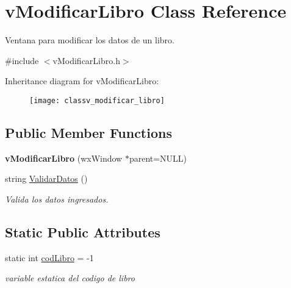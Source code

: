 \hypertarget{classv_modificar_libro}{}\section{v\+Modificar\+Libro Class Reference}
\label{classv_modificar_libro}


Ventana para modificar los datos de un libro.  




{\ttfamily \#include $<$v\+Modificar\+Libro.\+h$>$}

Inheritance diagram for v\+Modificar\+Libro\+:\begin{figure}[H]
\begin{center}
\leavevmode
\texttt{[image: classv\_modificar\_libro]}
\end{center}
\end{figure}
\subsection*{Public Member Functions}
\begin{DoxyCompactItemize}
\item 
{\bfseries v\+Modificar\+Libro} (wx\+Window $\ast$parent=N\+U\+LL)\hypertarget{classv_modificar_libro_ab9f38d4cbc620858c99c91dad0af5493}{}\label{classv_modificar_libro_ab9f38d4cbc620858c99c91dad0af5493}

\item 
string \hyperlink{classv_modificar_libro_a175daf636185fd7814692fed543fda21}{Validar\+Datos} ()\hypertarget{classv_modificar_libro_a175daf636185fd7814692fed543fda21}{}\label{classv_modificar_libro_a175daf636185fd7814692fed543fda21}

\begin{DoxyCompactList}\small\item\em Valida los datos ingresados. \end{DoxyCompactList}\end{DoxyCompactItemize}
\subsection*{Static Public Attributes}
\begin{DoxyCompactItemize}
\item 
static int \hyperlink{classv_modificar_libro_a88a10764b43adc0d365871ad2da42d28}{cod\+Libro} = -\/1
\begin{DoxyCompactList}\small\item\em variable estatica del codigo de libro \end{DoxyCompactList}\end{DoxyCompactItemize}
